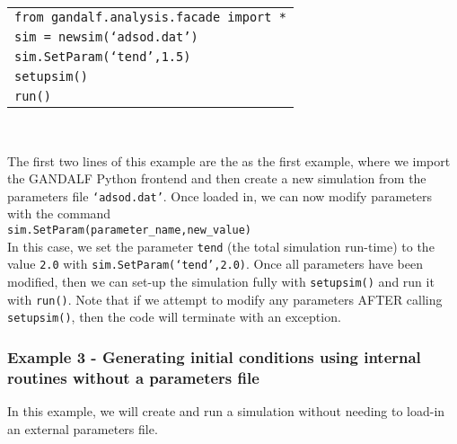 \documentclass[a4paper]{article}
\newcommand{\var}[1]{\texttt{#1}}
\newcommand{\singlecommand}[1]{\\ \newline \indent \var{#1} \\ \newline \noindent}
\begin{document}
\begin{tabular}{p{14.0cm}}
\var{from gandalf.analysis.facade import *} \\
\var{sim = newsim(`adsod.dat')} \\
\var{sim.SetParam(`tend',1.5)} \\
\var{setupsim()} \\
\var{run()} \\
\end{tabular} \\
\newline

\noindent The first two lines of this example are the as the first example, where we import the GANDALF Python frontend and then create a new simulation from the parameters file \var{`adsod.dat'}.  Once loaded in, we can now modify parameters with the command \singlecommand{sim.SetParam(parameter\_name,new\_value)}  In this case, we set the parameter \var{tend} (the total simulation run-time) to the value \var{2.0} with \var{sim.SetParam(`tend',2.0)}.  Once all parameters have been modified, then we can set-up the simulation fully with \var{setupsim()} and run it with \var{run()}.  Note that if we attempt to modify any parameters AFTER calling \var{setupsim()}, then the code will terminate with an exception.


\subsubsection{Example 3 - Generating initial conditions using internal routines without a parameters file}
In this example, we will create and run a simulation without needing to load-in an external parameters file. \\
\end{document}
